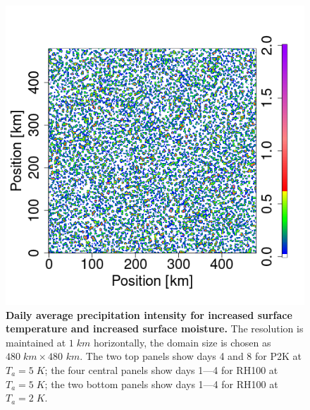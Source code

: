 \documentclass[draft,linenumbers]{agujournal2019}
\begin{document}
\begin{figure}[ht]
\includegraphics[trim={2cm 2.4cm 1cm 1cm}, clip, height=0.11\linewidth]{var1_daymean_T0_300K_ampl_4_1km_RH100_1153-1296.png}
\caption{{\bf Daily average precipitation intensity for increased surface temperature and increased surface moisture.} 
The resolution is maintained at $1\;km$ horizontally, the domain size is chosen as $480\;km\times 480$ $km$. The two top panels show days 4 and 8 for P2K at $T_a=5\;K$; 
the four central panels show days 1---4 for RH100 at $T_a=5\;K$;
the two bottom panels show days 1---4 for RH100 at $T_a=2\;K$.}
\label{fig:daily_mean_increased_T_q}
\end{figure}
\end{document}

